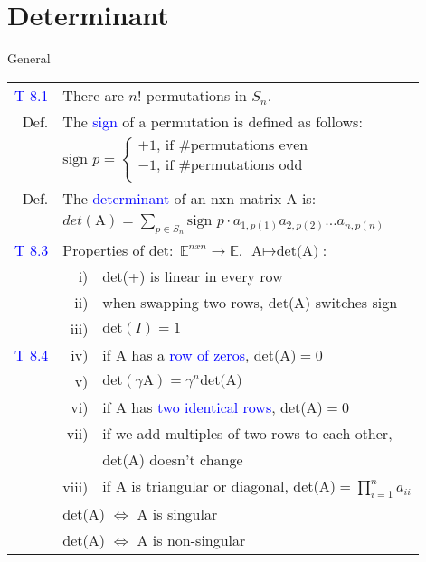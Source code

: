 \section{Determinant}
\begin{mainbox}{General}
\setlength{\tabcolsep}{2pt}
\begin{tabular}{rrl}
	\textcolor{blue}{T 8.1} & \multicolumn{2}{l}{There are $n!$ permutations in $S_n$.}\\
	\rule{0pt}{3ex}	
	Def. & \multicolumn{2}{l}{The \textcolor{blue}{sign} of a permutation is defined as follows:}\\
	& \multicolumn{2}{l}{$\text{sign }p = \begin{cases}
        +1\text{, if \#permutations even}\\
        -1\text{, if \#permutations odd}\\
    \end{cases}$}\\
    \rule{0pt}{3ex}
    Def. & \multicolumn{2}{l}{The \textcolor{blue}{determinant} of an nxn matrix A is:}\\
    & \multicolumn{2}{l}{$det(\text{A}) = \displaystyle\sum_{p\in S_n}\text{sign }p\cdot a_{1,p(1)}a_{2,p(2)} \ldots a_{n,p(n)}$}\\
    \rule{0pt}{3ex}
    \textcolor{blue}{T 8.3} & \multicolumn{2}{l}{Properties of $\text{det}:\;\mathbb{E}^{nxn}\rightarrow\mathbb{E}$, $\text{A}\mapsto \text{det(A)}$:}\\
    & i) & det(+) is linear in every row\\
    & ii) & when swapping two rows, det(A) switches sign\\
    & iii) & $\text{det}(I) = 1$\\
    \textcolor{blue}{T 8.4} & iv) & if A has a \textcolor{blue}{row of zeros}, det(A)$= 0$\\
    & v) & $\text{det}(\gamma \text{A}) = \gamma ^n \text{det(A)}$\\
    & vi) & if A has \textcolor{blue}{two identical rows}, det(A)$= 0$\\
    & vii) & if we add multiples of two rows to each other,\\
    & & det(A) doesn't change\\
    & viii) & if A is triangular or diagonal, det(A)$=\displaystyle\prod_{i=1}^n a_{ii}$\\
	\rule{0pt}{3ex}
	& \multicolumn{2}{l}{det(A) $\Leftrightarrow$ A is singular}\\
	& \multicolumn{2}{l}{det(A) $\Leftrightarrow$ A is non-singular}\\

\end{tabular}
\end{mainbox}
